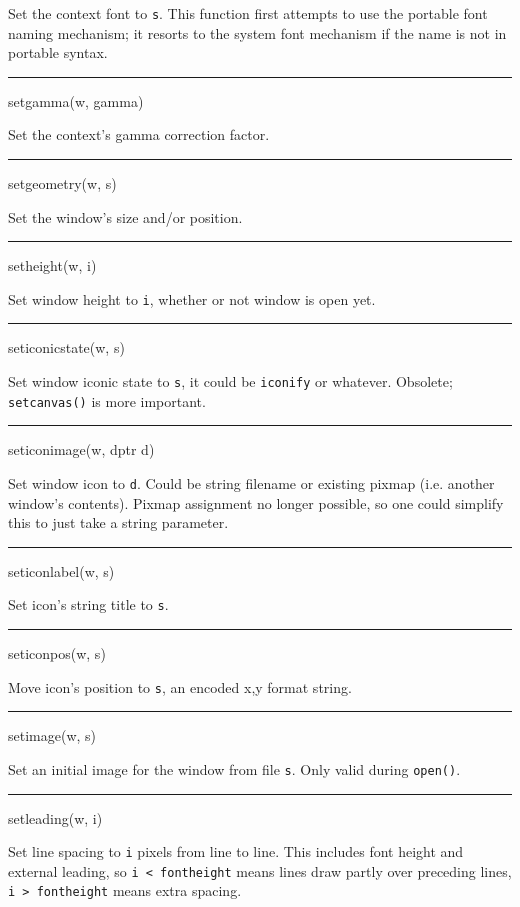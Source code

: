 Set the context font to \texttt{s}. This function first attempts to
use the portable font naming mechanism; it resorts to the system font
mechanism if the name is not in portable syntax.


\bigskip\hrule\vspace{0.1cm}
\noindent
setgamma(w, gamma)


Set the context's gamma correction factor.


\bigskip\hrule\vspace{0.1cm}
\noindent
setgeometry(w, s)


Set the window's size and/or position.


\bigskip\hrule\vspace{0.1cm}
\noindent
setheight(w, i)


Set window height to \texttt{i}, whether or not window is open yet.


\bigskip\hrule\vspace{0.1cm}
\noindent
seticonicstate(w, s)


Set window iconic state to \texttt{s}, it could be
\texttt{{\textquotedbl}iconify{\textquotedbl}} or whatever. Obsolete;
\texttt{setcanvas()} is more important.


\bigskip\hrule\vspace{0.1cm}
\noindent
seticonimage(w, dptr d)


Set window icon to \texttt{d}. Could be string filename or existing
pixmap (i.e. another window's contents). Pixmap assignment no longer
possible, so one could simplify this to just take a string parameter.


\bigskip\hrule\vspace{0.1cm}
\noindent
seticonlabel(w, s)


Set icon's string title to \texttt{s}.


\bigskip\hrule\vspace{0.1cm}
\noindent
seticonpos(w, s)


Move icon's position to \texttt{s}, an encoded
{\textquotedbl}x,y{\textquotedbl} format string.


\bigskip\hrule\vspace{0.1cm}
\noindent
setimage(w, s)


Set an initial image for the window from file \texttt{s}. Only valid
during \texttt{open()}.


\bigskip\hrule\vspace{0.1cm}
\noindent
setleading(w, i)


Set line spacing to \texttt{i} pixels from line to line. This includes
font height and external leading, so \texttt{i {\textless} fontheight}
means lines draw partly over preceding lines, \texttt{i {\textgreater}
fontheight} means extra spacing.


